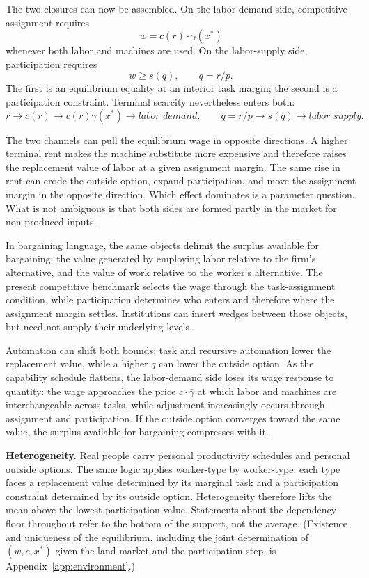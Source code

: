 \documentclass[12pt]{article}
\theoremstyle{plain}
\begin{document}
The two closures can now be assembled. On the labor-demand side, competitive
assignment requires
\[
w = c(r)\cdot\gamma(x^*)
\]
whenever both labor and machines are used. On the labor-supply side,
participation requires
\[
w \ge s(q), \qquad q=r/p.
\]
The first is an equilibrium equality at
an interior task margin; the second is a participation constraint. Terminal
scarcity nevertheless enters both:
\[
r
\to c(r)
\to c(r)\gamma(x^*)
\to \textit{labor demand},
\qquad
q=r/p
\to s(q)
\to \textit{labor supply}.
\]

The two channels can pull the equilibrium wage in opposite directions. A higher
terminal rent makes the machine substitute more expensive and therefore raises
the replacement value of labor at a given assignment margin. The same rise in
rent can erode the outside option, expand participation, and move the assignment
margin in the opposite direction. Which effect dominates is a parameter
question. What is not ambiguous is that both sides are formed partly in the
market for non-produced inputs.

In bargaining language, the same objects delimit the surplus
available for bargaining: the value generated by employing labor relative to
the firm's alternative, and the value of work relative to the worker's
alternative. The present competitive benchmark selects the wage through the
task-assignment condition, while participation determines who enters and
therefore where the assignment margin settles. Institutions can insert wedges
between those objects, but need not supply their underlying levels.

Automation can shift both bounds: task and recursive automation lower the replacement value, while a higher $q$ can lower the outside option. As the capability
schedule flattens, the labor-demand side loses its wage response to quantity: the
wage approaches the price $c\cdot\bar{\gamma}$ at which labor and machines are
interchangeable across tasks, while adjustment increasingly occurs through
assignment and participation. If the outside option
converges toward the same value, the surplus available for bargaining compresses
with it.

\textbf{Heterogeneity.} Real people carry personal productivity schedules and
personal outside options. The same logic applies worker-type by worker-type:
each type faces a replacement value determined by its marginal task and a
participation constraint determined by its outside option. Heterogeneity
therefore lifts the mean above the lowest participation value. Statements about
the dependency floor throughout refer to the bottom of the support, not the
average. (Existence and uniqueness of the equilibrium, including the joint
determination of $(w,c,x^*)$ given the land market and the participation step,
is Appendix~\ref{app:environment}.)
\end{document}
